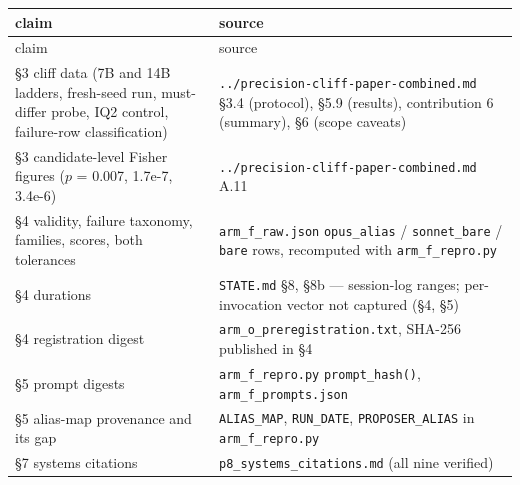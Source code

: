 \documentclass[11pt]{article}
\begin{document}
\begingroup
\small
\setlength{\LTpre}{\medskipamount}
\setlength{\LTpost}{\medskipamount}
\begin{longtable}{@{}p{}p{}@{}}
\toprule
claim & source \\
\midrule
\endfirsthead
\toprule
claim & source \\
\midrule
\endhead
\bottomrule
\endfoot
\S3 cliff data (7B and 14B ladders, fresh-seed run, must-differ probe, IQ2 control, failure-row classification) & \texttt{../precision-cliff-paper-combined.md} \S3.4 (protocol), \S5.9 (results), contribution 6 (summary), \S6 (scope caveats) \\
\addlinespace
\S3 candidate-level Fisher figures ($p$ = 0.007, 1.7e-7, 3.4e-6) & \texttt{../precision-cliff-paper-combined.md} A.11 \\
\addlinespace
\S4 validity, failure taxonomy, families, scores, both tolerances & \texttt{arm\_f\_raw.json} \texttt{opus\_alias} / \texttt{sonnet\_bare} / \texttt{bare} rows, recomputed with \texttt{arm\_f\_repro.py} \\
\addlinespace
\S4 durations & \texttt{STATE.md} \S8, \S8b --- session-log ranges; per-invocation vector not captured (\S4, \S5) \\
\addlinespace
\S4 registration digest & \texttt{arm\_o\_preregistration.txt}, SHA-256 published in \S4 \\
\addlinespace
\S5 prompt digests & \texttt{arm\_f\_repro.py} \texttt{prompt\_hash()}, \texttt{arm\_f\_prompts.json} \\
\addlinespace
\S5 alias-map provenance and its gap & \texttt{ALIAS\_MAP}, \texttt{RUN\_DATE}, \texttt{PROPOSER\_ALIAS} in \texttt{arm\_f\_repro.py} \\
\addlinespace
\S7 systems citations & \texttt{p8\_systems\_citations.md} (all nine verified)
\end{longtable}
\endgroup

\nocite{*}


\end{document}
